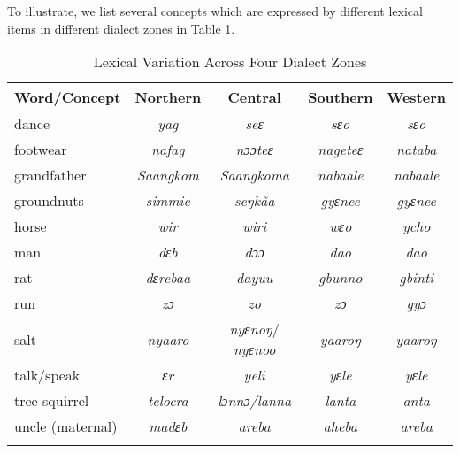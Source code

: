 \begin{refsection}
To illustrate, we list several concepts which are expressed by different lexical items in different dialect zones in Table \ref{tab:dialects}.

\begin{table}
    \begin{tabular}{lcccc}\\
    \lsptoprule 
    Word/Concept & Northern & Central & Southern & Western \\\hline
    dance    &\textit{ yag} &\textit{seɛ}  & \textit{ sɛo}&\textit{sɛo} \\
    footwear    &\textit{ nafag} &\textit{nɔɔteɛ}  & \textit{nageteɛ}&\textit{ nataba} \\
    grandfather    &\textit{ Saangkom} &\textit{ Saangkoma}  & \textit{ nabaale}&\textit{ nabaale} \\
    groundnuts    &\textit{ simmie} &\textit{seŋkãa}& \textit{ gyɛnee}&\textit{ gyɛnee} \\
    horse    &\textit{ wir} &\textit{ wiri}  & \textit{ wɛo}&\textit{ ycho} \\
    man    &\textit{dɛb} &\textit{dɔɔ}  & \textit{dao}&\textit{dao} \\
    rat    &\textit{ dɛrebaa} &\textit{dayuu}  & \textit{ gbunno}&\textit{ gbinti} \\
    run    &\textit{zɔ} &\textit{zo}  & \textit{zɔ}&\textit{gyɔ} \\
    salt  & \textit{ nyaaro} &  \textit{ nyɛnoŋ}/\textit{ nyɛnoo}& \textit{yaaroŋ}     & \textit{yaaroŋ}  \\
    talk/speak    &\textit{ ɛr} &\textit{yeli}  & \textit{yɛle}&\textit{yɛle} \\
    tree squirrel    &\textit{ telocra} &\textit{ lɔnnɔ/lanna}  & \textit{ lanta}&\textit{ anta} \\
    uncle (maternal)    &\textit{ madɛb} &\textit{ areba}  & \textit{ aheba}&\textit{ areba} \\
    \lspbottomrule
    \end{tabular}
    \caption{Lexical Variation Across Four Dialect Zones}
    \label{tab:dialects}
\end{table}

    
    
     

   




\end{refsection}
